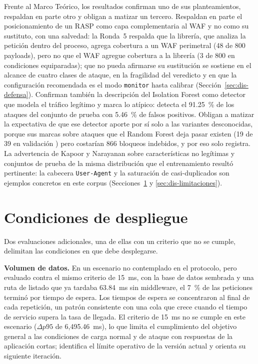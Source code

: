 Frente al Marco Teórico, los resultados confirman uno de sus planteamientos, respaldan en parte otro
y obligan a matizar un tercero. Respaldan en parte el posicionamiento de un RASP como capa
complementaria al WAF y no como su sustituto, con una salvedad: la Ronda~5 respalda que la librería, que analiza la petición dentro del
proceso, agrega cobertura a un WAF perimetral (48 de 800 payloads), pero no que el WAF agregue
cobertura a la librería (3 de 800 en condiciones equiparadas); que no pueda afirmarse su sustitución se
sostiene en el alcance de cuatro clases de ataque, en la fragilidad del veredicto y en que la
configuración recomendada es el modo \texttt{monitor} hasta calibrar
(Sección~\ref{sec:dis-defensa}). Confirman también la descripción
del Isolation Forest como detector que modela el tráfico legítimo y marca lo atípico: detecta el
91.25~\% de los ataques del conjunto de prueba con 5.46~\% de falsos positivos. Obligan a matizar
la expectativa de que ese detector aporte por sí solo a las variantes desconocidas, porque sus
marcas sobre ataques que el Random Forest deja pasar existen (19 de 39 en validación \cite{valenzuela2026ia}) pero
costarían 866 bloqueos indebidos, y por eso solo registra. La advertencia de Kapoor y Narayanan
\cite{kapoor2023} sobre características no legítimas y conjuntos de prueba de la misma distribución
que el entrenamiento resultó pertinente: la cabecera \texttt{User-Agent} y la saturación de
casi-duplicados son ejemplos concretos en este corpus (Secciones~\ref{sec:dis-despliegue} y
\ref{sec:dis-limitaciones}).

\section{Condiciones de despliegue}
\label{sec:dis-despliegue}

Dos evaluaciones adicionales, una de ellas con un criterio que no se cumple, delimitan las
condiciones en que debe desplegarse.

\textbf{Volumen de datos.} En un escenario no contemplado en el protocolo, pero evaluado contra el mismo criterio de 15~ms, con la base de datos
sembrada y una ruta de listado que ya tardaba 63.84~ms sin middleware, el 7~\% de las peticiones
terminó por tiempo de espera. Los tiempos de espera se concentraron al final de cada repetición,
un patrón consistente con una cola que crece cuando el tiempo de servicio supera la tasa de
llegada. El criterio de 15~ms no se cumple en este escenario ($\Delta p95$ de 6{,}495.46~ms), lo que
limita el cumplimiento del objetivo general a las condiciones de carga normal y de ataque con
respuestas de la aplicación cortas; identifica el límite operativo de la versión actual y
orienta su siguiente iteración.

